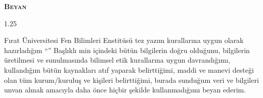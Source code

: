 \begin{titlepage}

\begin{center}
\begin{Large}
\vspace{-1cm}
\bfseries\textsc{Beyan\\}
\end{Large}
\end{center}

\begin{spacing}{1.25}
\begin{justify}
\begin{footnotesize}

\setlength{\parindent}{1cm}
\hspace{1cm}Fırat Üniversitesi Fen Bilimleri Enstitüsü tez yazım kurallarına uygun olarak hazırladığım “\tezbasligi” Başlıklı \derece min içindeki bütün bilgilerin doğru olduğunu, bilgilerin üretilmesi ve sunulmasında bilimsel etik kurallarına uygun davrandığımı, kullandığım bütün kaynakları atıf yaparak belirttiğimi, maddi ve manevi desteği olan tüm kurum/kuruluş ve kişileri belirttiğimi, burada sunduğum veri ve bilgileri unvan almak amacıyla daha önce hiçbir şekilde kullanmadığımı beyan ederim.
\vspace{0.7cm}
\end{footnotesize}
\end{justify}
\end{spacing}
{\small\raggedleft \st \hspace{1cm} \, \\\vspace{1cm}}
\raggedleft{\small\textbf{\tezyazari} \hspace{0.3cm} \,}
\newpage
\end{titlepage}



